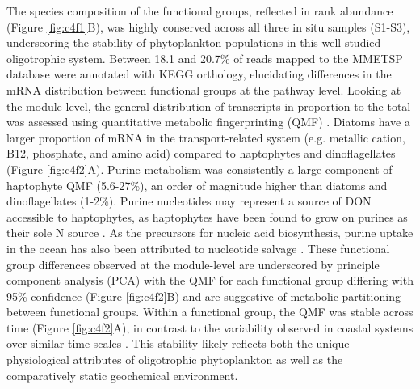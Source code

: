 The species composition of the functional groups, reflected in rank abundance (Figure \ref{fig:c4f1}B), was highly conserved across all three in situ samples (S1-S3), underscoring the stability of phytoplankton populations in this well-studied oligotrophic system. Between 18.1 and 20.7\% of reads mapped to the MMETSP database were annotated with KEGG orthology, elucidating differences in the mRNA distribution between functional groups at the pathway level. Looking at the module-level, the general distribution of transcripts in proportion to the total was assessed using quantitative metabolic fingerprinting (QMF) \citep{Alexander2015}. Diatoms have a larger proportion of mRNA in the transport-related system (e.g. metallic cation, B12, phosphate, and amino acid) compared to haptophytes and dinoflagellates (Figure \ref{fig:c4f2}A). Purine metabolism was consistently a large component of haptophyte QMF (5.6-27\%), an order of magnitude higher than diatoms and dinoflagellates (1-2\%). Purine nucleotides may represent a source of DON accessible to haptophytes, as haptophytes have been found to grow on purines as their sole N source \citep{Palenik1997}. As the precursors for nucleic acid biosynthesis, purine uptake in the ocean has also been attributed to nucleotide salvage \citep{Winn1984}. These functional group differences observed at the module-level are underscored by principle component analysis (PCA) with the QMF for each functional group differing with 95\% confidence (Figure \ref{fig:c4f2}B) and are suggestive of metabolic partitioning between functional groups. Within a functional group, the QMF was stable across time (Figure \ref{fig:c4f2}A), in contrast to the variability observed in coastal systems over similar time scales \citep{Alexander2015, Dupont2015}. This stability likely reflects both the unique physiological attributes of oligotrophic phytoplankton as well as the comparatively static geochemical environment. \par

